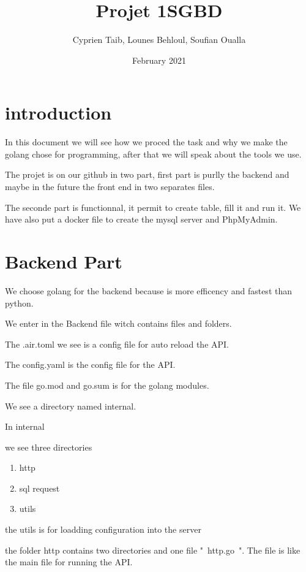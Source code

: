 \documentclass{article}
\title{Projet 1SGBD}
\author{Cyprien Taib, Lounes Behloul, Soufian Oualla}
\date{February 2021}
\begin{document}
    \maketitle
    \section{introduction}
        
    In this document we will see how we proced the task and why we make the golang chose for programming, after that we will speak about the tools we use.


    The projet is on our github in two part, first part is purlly the backend and maybe in the future the front end in two separates files. \newline\newline

    The seconde part is functionnal, it permit to create table, fill it and run it. We have also put a docker file to create the mysql server and PhpMyAdmin.
   
    
    \section{Backend Part}

    We choose golang for the backend because is more efficency and fastest than python. 

    We enter in the Backend file witch contains files and folders.

    The .air.toml we see is a config file for auto reload the API.

    The config.yaml is the config file for the API.

    The file go.mod and go.sum is for the golang modules.

    We see a directory named internal.

        In internal

    we see three directories
        \begin{enumerate}
            \item http
            \item sql request
            \item utils
        \end{enumerate}

    the utils is for loadding configuration into the server \newline\newline

    the folder http contains two directories and one file " http.go ". The file is like the main file for running the API.  
\end{document}

